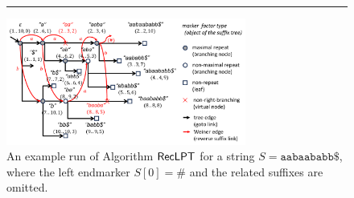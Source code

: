 \documentclass{article}
\begin{document}
\begin{figure}[t]
  \centering
  \rule{0.09\textwidth}{0em}
\includegraphics[width=0.7\textwidth]{fig2.pdf}
\vspace{.75\baselineskip}
\caption{An example run of Algorithm $\textsf{RecLPT}$ for a string $S = \mathtt{aabaababb\$}$, where the left endmarker $S[0]=\#$ and the related suffixes are omitted. 
}\label{fig:run:example}
\end{figure}









\end{document}
